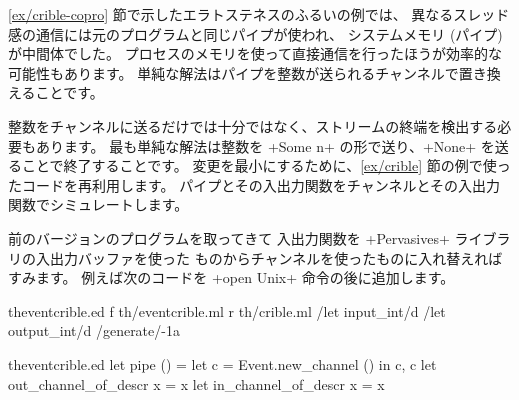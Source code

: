 \begin{example}
\ref{ex/crible-copro} 節で示したエラトステネスのふるいの例では、
異なるスレッド感の通信には元のプログラムと同じパイプが使われ、
システムメモリ (パイプ) が中間体でした。
プロセスのメモリを使って直接通信を行ったほうが効率的な可能性もあります。
単純な解法はパイプを整数が送られるチャンネルで置き換えることです。

整数をチャンネルに送るだけでは十分ではなく、ストリームの終端を検出する必要もあります。
最も単純な解法は整数を \ml+Some n+ の形で送り、\ml+None+ を送ることで終了することです。
変更を最小にするために、\ref{ex/crible} 節の例で使ったコードを再利用します。
パイプとその入出力関数をチャンネルとその入出力関数でシミュレートします。

前のバージョンのプログラムを取ってきて
入出力関数を \ml+Pervasives+ ライブラリの入出力バッファを使った
ものからチャンネルを使ったものに入れ替えればすみます。
例えば次のコードを \ml+open Unix+ 命令の後に追加します。
%
\begin{codefile}{theventcrible.ed}
f th/eventcrible.ml
r th/crible.ml
/let input_int/d
/let output_int/d
/generate/-1a
\end{codefile}
%
\begin{listingcodefile}{theventcrible.ed}
let pipe () = let c = Event.new_channel () in c, c
let out_channel_of_descr x = x
let in_channel_of_descr x = x


\end{listingcodefile}
\end{example}
